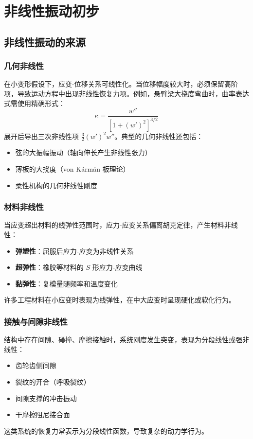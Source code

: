 \chapter{非线性振动初步}

\section{非线性振动的来源}
\subsection{几何非线性}
在小变形假设下，应变-位移关系可线性化。当位移幅度较大时，必须保留高阶项，导致运动方程中出现非线性恢复力项。例如，悬臂梁大挠度弯曲时，曲率表达式需使用精确形式：
\[
\kappa = \frac{w''}{[1+(w')^{2}]^{3/2}}
\]
展开后导出三次非线性项 $\frac{3}{2}(w')^{2}w''$。典型的几何非线性还包括：
\begin{itemize}
    \item 弦的大振幅振动（轴向伸长产生非线性张力）
    \item 薄板的大挠度（von K\'arm\'an 板理论）
    \item 柔性机构的几何非线性刚度
\end{itemize}

\subsection{材料非线性}
当应变超出材料的线弹性范围时，应力-应变关系偏离胡克定律，产生材料非线性：
\begin{itemize}
    \item \textbf{弹塑性}：屈服后应力-应变为非线性关系
    \item \textbf{超弹性}：橡胶等材料的 $S$ 形应力-应变曲线
    \item \textbf{黏弹性}：复模量随频率和温度变化
\end{itemize}
许多工程材料在小应变时表现为线弹性，在中大应变时呈现硬化或软化行为。

\subsection{接触与间隙非线性}
结构中存在间隙、碰撞、摩擦接触时，系统刚度发生突变，表现为分段线性或强非线性：
\begin{itemize}
    \item 齿轮齿侧间隙
    \item 裂纹的开合（呼吸裂纹）
    \item 间隙支撑的冲击振动
    \item 干摩擦阻尼接合面
\end{itemize}
这类系统的恢复力常表示为分段线性函数，导致复杂的动力学行为。

